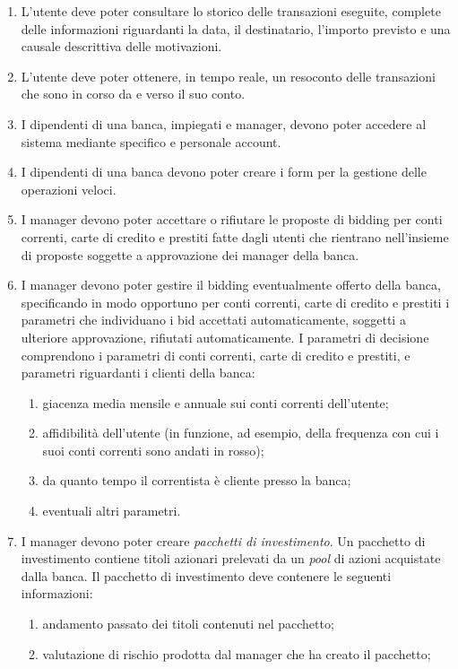 \begin{enumerate}
\begin{enumerate}
	\end{enumerate}
	\item L'utente deve poter consultare lo storico delle transazioni eseguite, complete delle informazioni riguardanti la data, il destinatario, l'importo previsto e una causale descrittiva delle motivazioni.
	\item L'utente deve poter ottenere, in tempo reale, un resoconto delle transazioni che sono in corso da e verso il suo conto.
	\item I dipendenti di una banca, impiegati e manager, devono poter accedere al sistema mediante specifico e personale account.
	\item I dipendenti di una banca devono poter creare i form per la gestione delle operazioni veloci.
	\item I manager devono poter accettare o rifiutare le proposte di bidding per conti correnti, carte di credito e prestiti fatte dagli utenti che rientrano nell'insieme di proposte soggette a approvazione dei manager della banca.
	\item I manager devono poter gestire il bidding eventualmente offerto della banca, specificando in modo opportuno per conti correnti, carte di credito e prestiti i parametri che individuano i bid accettati automaticamente, soggetti a ulteriore approvazione, rifiutati automaticamente.
	I parametri di decisione comprendono i parametri di conti correnti, carte di credito e prestiti, e parametri riguardanti i clienti della banca:
		\begin{enumerate}
			\item giacenza media mensile e annuale sui conti correnti dell'utente;
			\item affidibilit\`a dell'utente (in funzione, ad esempio, della frequenza con cui i suoi conti correnti sono andati in rosso);
			\item da quanto tempo il correntista \`e cliente presso la banca;
			\item eventuali altri parametri.
		\end{enumerate}
	\item I manager devono poter creare \emph{pacchetti di investimento}.
		Un pacchetto di investimento contiene titoli azionari prelevati da un \emph{pool} di azioni acquistate dalla banca.
		Il pacchetto di investimento deve contenere le seguenti informazioni:
		\begin{enumerate}
			\item andamento passato dei titoli contenuti nel pacchetto;
			\item valutazione di rischio prodotta dal manager che ha creato il pacchetto;

\end{enumerate}
\end{enumerate}
